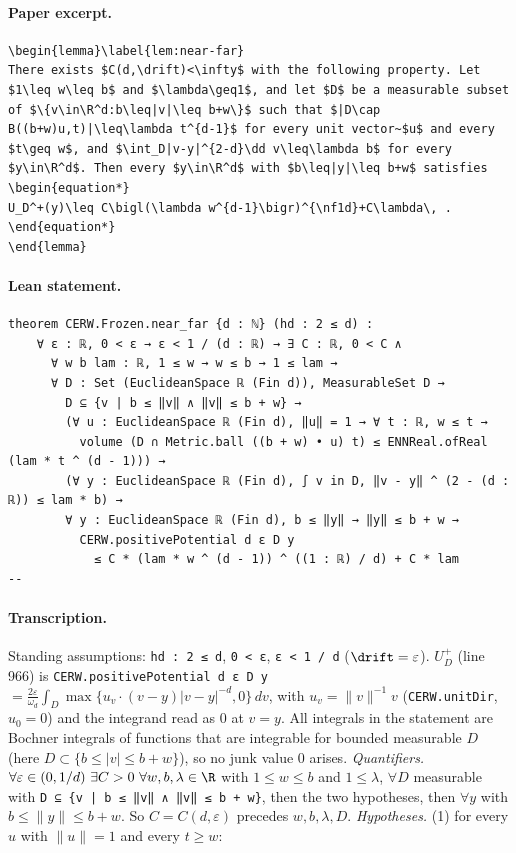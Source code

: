\paragraph{Paper excerpt.}
\begin{verbatim}
\begin{lemma}\label{lem:near-far}
There exists $C(d,\drift)<\infty$ with the following property. Let $1\leq w\leq b$ and $\lambda\geq1$, and let $D$ be a measurable subset of $\{v\in\R^d:b\leq|v|\leq b+w\}$ such that $|D\cap B((b+w)u,t)|\leq\lambda t^{d-1}$ for every unit vector~$u$ and every $t\geq w$, and $\int_D|v-y|^{2-d}\dd v\leq\lambda b$ for every $y\in\R^d$. Then every $y\in\R^d$ with $b\leq|y|\leq b+w$ satisfies
\begin{equation*}
U_D^+(y)\leq C\bigl(\lambda w^{d-1}\bigr)^{\nf1d}+C\lambda\, .
\end{equation*}
\end{lemma}
\end{verbatim}
\paragraph{Lean statement.}
\begin{verbatim}
theorem CERW.Frozen.near_far {d : ℕ} (hd : 2 ≤ d) :
    ∀ ε : ℝ, 0 < ε → ε < 1 / (d : ℝ) → ∃ C : ℝ, 0 < C ∧
      ∀ w b lam : ℝ, 1 ≤ w → w ≤ b → 1 ≤ lam →
      ∀ D : Set (EuclideanSpace ℝ (Fin d)), MeasurableSet D →
        D ⊆ {v | b ≤ ‖v‖ ∧ ‖v‖ ≤ b + w} →
        (∀ u : EuclideanSpace ℝ (Fin d), ‖u‖ = 1 → ∀ t : ℝ, w ≤ t →
          volume (D ∩ Metric.ball ((b + w) • u) t) ≤ ENNReal.ofReal (lam * t ^ (d - 1))) →
        (∀ y : EuclideanSpace ℝ (Fin d), ∫ v in D, ‖v - y‖ ^ (2 - (d : ℝ)) ≤ lam * b) →
        ∀ y : EuclideanSpace ℝ (Fin d), b ≤ ‖y‖ → ‖y‖ ≤ b + w →
          CERW.positivePotential d ε D y
            ≤ C * (lam * w ^ (d - 1)) ^ ((1 : ℝ) / d) + C * lam
--
\end{verbatim}
\paragraph{Transcription.}
Standing assumptions: \verb!hd : 2 ≤ d!, \verb!0 < ε!, \verb!ε < 1 / d! ($\drift=\varepsilon$). $U_D^+$ (line 966) is \verb!CERW.positivePotential d ε D y! $=\frac{2\varepsilon}{\omega_d}\int_D\max\{u_v\cdot(v-y)|v-y|^{-d},0\}\,dv$, with $u_v=\|v\|^{-1}v$ (\verb!CERW.unitDir!, $u_0=0$) and the integrand read as $0$ at $v=y$. All integrals in the statement are Bochner integrals of functions that are integrable for bounded measurable $D$ (here $D\subset\{b\le|v|\le b+w\}$), so no junk value $0$ arises. \emph{Quantifiers.} $\forall\varepsilon\in(0,1/d)\ \exists C>0\ \forall w,b,\lambda\in\R$ with $1\le w\le b$ and $1\le\lambda$, $\forall D$ measurable with \verb!D ⊆ {v | b ≤ ‖v‖ ∧ ‖v‖ ≤ b + w}!, then the two hypotheses, then $\forall y$ with $b\le\|y\|\le b+w$. So $C=C(d,\varepsilon)$ precedes $w,b,\lambda,D$. \emph{Hypotheses.} (1) for every $u$ with $\|u\|=1$ and every $t\ge w$:
